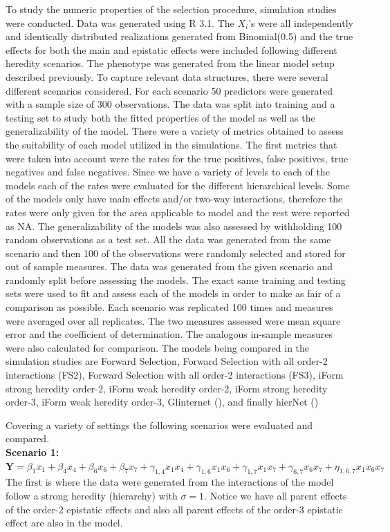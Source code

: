 \documentclass[11pt,]{book}
\theoremstyle{definition}
\theoremstyle{definition}
\theoremstyle{remark}
\begin{document}
To study the numeric properties of the selection procedure, simulation
studies were conducted. Data was generated using R 3.1. The \(X_i\)'s
were all independently and identically distributed realizations
generated from Binomial(0.5) and the true effects for both the main and
epistatic effects were included following different heredity scenarios.
The phenotype was generated from the linear model setup described
previously. To capture relevant data structures, there were several
different scenarios considered. For each scenario 50 predictors were
generated with a sample size of 300 observations. The data was split
into training and a testing set to study both the fitted properties of
the model as well as the generalizability of the model. There were a
variety of metrics obtained to assess the suitability of each model
utilized in the simulations. The first metrics that were taken into
account were the rates for the true positives, false positives, true
negatives and false negatives. Since we have a variety of levels to each
of the models each of the rates were evaluated for the different
hierarchical levels. Some of the models only have main effects and/or
two-way interactions, therefore the rates were only given for the area
applicable to model and the rest were reported as NA. The
generalizability of the models was also assessed by withholding 100
random observations as a test set. All the data was generated from the
same scenario and then 100 of the observations were randomly selected
and stored for out of sample measures. The data was generated from the
given scenario and randomly split before assessing the models. The exact
same training and testing sets were used to fit and assess each of the
models in order to make as fair of a comparison as possible. Each
scenario was replicated 100 times and measures were averaged over all
replicates. The two measures assessed were mean square error and the
coefficient of determination. The analogous in-sample measures were also
calculated for comparison. The models being compared in the simulation
studies are Forward Selection, Forward Selection with all order-2
interactions (FS2), Forward Selection with all order-2 interactions
(FS3), iForm strong heredity order-2, iForm weak heredity order-2, iForm
strong heredity order-3, iForm weak heredity order-3, Glinternet
(\cite{bien2013lasso}), and finally hierNet (\cite{lim2015learning})

Covering a variety of settings the following scenarios were evaluated
and compared.\\
\textbf{Scenario 1:}
\(\mathbf{Y}=\beta_1 x_1+\beta_4 x_4+\beta_6 x_6+\beta_7 x_7+\gamma_{1,4} x_1 x_4+\gamma_{1,6} x_1 x_6+\gamma_{1,7} x_1 x_7+\gamma_{6,7} x_6 x_7+\eta_{1,6,7} x_1 x_6 x_7\)
The first is where the data were generated from the interactions of the
model follow a strong heredity (hierarchy) with \(\sigma = 1\). Notice
we have all parent effects of the order-2 epistatic effects and also all
parent effects of the order-3 epistatic effect are also in the model.
\end{document}

